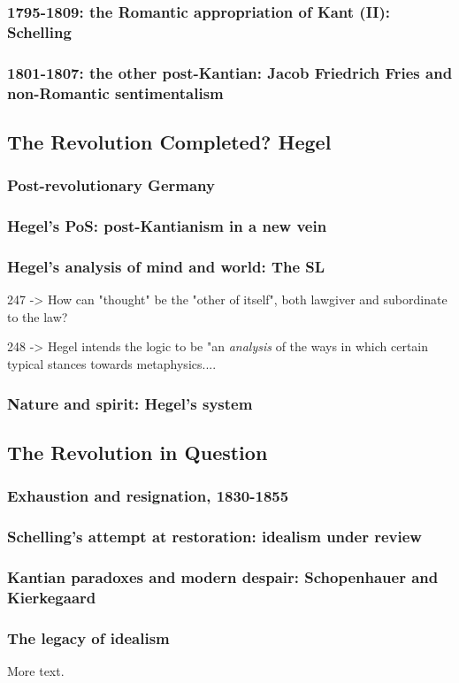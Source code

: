 \documentclass[11pt]{article} %
\begin{document}
\subsubsection{1795-1809: the Romantic appropriation of Kant (II): Schelling}
\subsubsection{1801-1807: the other post-Kantian: Jacob Friedrich Fries and non-Romantic sentimentalism}
\subsection{The Revolution Completed? Hegel}
\subsubsection{Post-revolutionary Germany}
\subsubsection{Hegel's PoS: post-Kantianism in a new vein}
\subsubsection{Hegel's analysis of mind and world: The SL}
247 -> How can "thought" be the "other of itself", both lawgiver and subordinate to the law?

248 -> Hegel intends the logic to be "an \emph{analysis} of the ways in which
certain typical stances towards metaphysics....
\subsubsection{Nature and spirit: Hegel's system}
\subsection{The Revolution in Question}
\subsubsection{Exhaustion and resignation, 1830-1855}
\subsubsection{Schelling's attempt at restoration: idealism under review}
\subsubsection{Kantian paradoxes and modern despair: Schopenhauer and Kierkegaard}
\subsubsection{The legacy of idealism}
More text.
\end{document}
